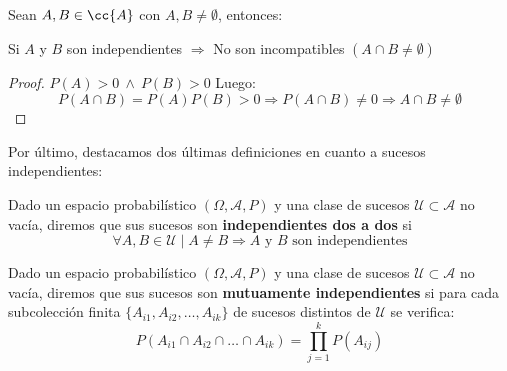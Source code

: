 \begin{prop}
    Sean $A,B \in \cc{A}$ con $A,B \neq \emptyset$, entonces:
    \begin{center}
        Si $A$ y $B$ son independientes $\Rightarrow$ No son incompatibles $(A \cap B \neq \emptyset)$
    \end{center}
\end{prop}
\begin{proof}
  $P(A) > 0 \ \land \ P(B)>0$ Luego:
  $$P(A \cap B) = P(A) P(B) > 0 \Rightarrow P(A \cap B) \neq 0 \Rightarrow A \cap B \neq \emptyset$$
\end{proof}

Por último, destacamos dos últimas definiciones en cuanto a sucesos independientes:
\begin{definicion} 
    Dado un espacio probabilístico $(\Omega, \mathcal{A}, P)$ y una clase de sucesos $\mathcal{U} \subset \mathcal{A}$ no vacía, diremos que sus sucesos son \textbf{independientes dos a dos} si
    $$\forall A, B \in \mathcal{U} \mid A \neq B \Rightarrow A \mbox{ y } B \mbox{ son independientes}$$
\end{definicion}

\begin{definicion} 
    Dado un espacio probabilístico $(\Omega, \mathcal{A}, P)$ y una clase de sucesos $\mathcal{U} \subset \mathcal{A}$ no vacía, diremos que sus sucesos son \textbf{mutuamente independientes} si para cada subcolección finita $\{A_{i1}, A_{i2}, \ldots, A_{ik}\}$ de sucesos distintos de $\mathcal{U}$ se verifica:
    $$P(A_{i1} \cap A_{i2} \cap \ldots \cap A_{ik}) = \prod_{j=1}^k P(A_{ij})$$
\end{definicion}